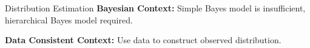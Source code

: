 \begin{block}{Distribution Estimation}
\centering
            {\large \textbf{Bayesian Context:} Simple Bayes model is insufficient, hierarchical Bayes model required.}
           
           {\large \textbf{Data Consistent Context:} Use data to construct observed distribution.}
           
           {\large \  }

             
\end{block}

\vspace{-0.75cm}
